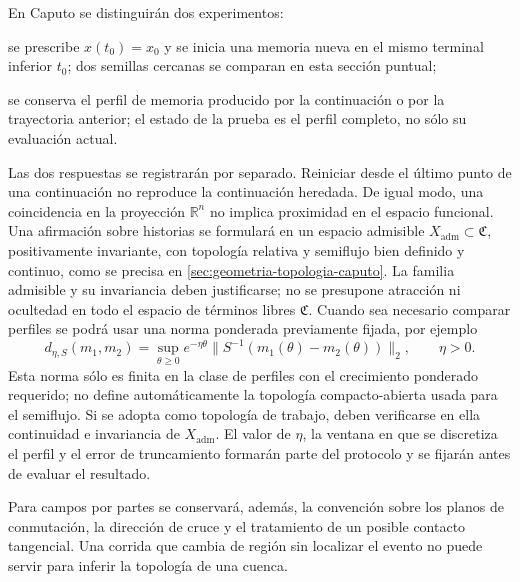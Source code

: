 En Caputo se distinguirán dos experimentos:

\begin{description}[leftmargin=3.7cm,style=nextline]
  \item[reinicio o corte reset]
  se prescribe \(x(t_0)=x_0\) y se inicia una memoria nueva en el mismo terminal
  inferior \(t_0\); dos semillas cercanas se comparan en esta sección puntual;

  \item[historia heredada]
  se conserva el perfil de memoria producido por la continuación o por la
  trayectoria anterior; el estado de la prueba es el perfil completo, no sólo
  su evaluación actual.
\end{description}

Las dos respuestas se registrarán por separado. Reiniciar desde el último
punto de una continuación no reproduce la continuación heredada. De igual
modo, una coincidencia en la proyección \(\mathbb R^n\) no implica proximidad
en el espacio funcional. Una afirmación sobre historias se formulará en un
espacio admisible \(X_{\mathrm{adm}}\subset\mathfrak C\), positivamente
invariante, con topología relativa y semiflujo bien definido y continuo, como
se precisa en \cref{sec:geometria-topologia-caputo}. La familia admisible y
su invariancia deben justificarse; no se presupone atracción ni ocultedad en
todo el espacio de términos libres \(\mathfrak C\). Cuando sea necesario
comparar perfiles se podrá usar una norma ponderada previamente fijada, por ejemplo
\begin{equation}
 d_{\eta,S}(m_1,m_2)=
 \sup_{\theta\geq0}e^{-\eta\theta}
 \lVert S^{-1}(m_1(\theta)-m_2(\theta))\rVert_2,
 \qquad \eta>0.
 \label{camp:eq-history-distance}
\end{equation}
Esta norma sólo es finita en la clase de perfiles con el crecimiento
ponderado requerido; no define automáticamente la topología compacto-abierta
usada para el semiflujo. Si se adopta como topología de trabajo, deben
verificarse en ella continuidad e invariancia de \(X_{\mathrm{adm}}\).
El valor de \(\eta\), la ventana en que se discretiza el perfil y el error de
truncamiento formarán parte del protocolo y se fijarán antes de evaluar el
resultado.

Para campos por partes se conservará, además, la convención sobre los planos
de conmutación, la dirección de cruce y el tratamiento de un posible contacto
tangencial. Una corrida que cambia de región sin localizar el evento no puede
servir para inferir la topología de una cuenca.

